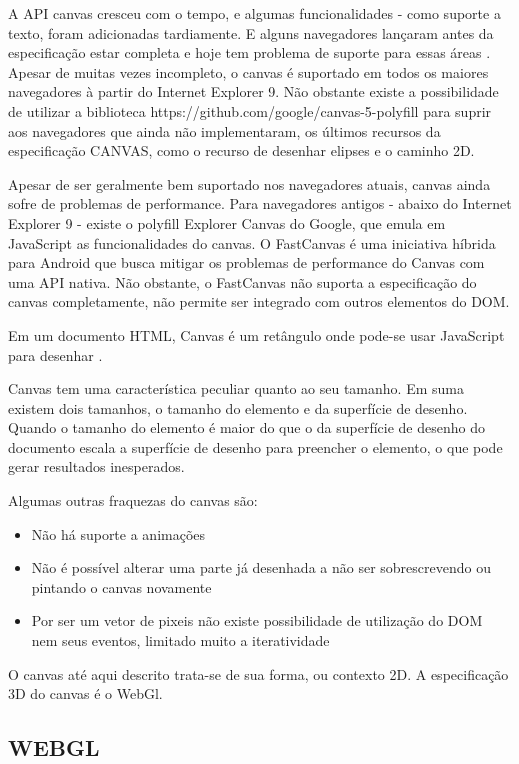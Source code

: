 A API canvas cresceu com o tempo, e algumas funcionalidades - como
suporte a texto, foram adicionadas tardiamente. E alguns navegadores
lançaram antes da especificação estar completa e hoje tem problema
de suporte para essas áreas \autocite{diveIntohtml}. Apesar de muitas
vezes incompleto, o canvas é suportado em todos os maiores navegadores
à partir do Internet Explorer 9. Não obstante existe a possibilidade de utilizar
a biblioteca https://github.com/google/canvas-5-polyfill para
suprir aos navegadores que ainda não implementaram, os últimos recursos
da especificação CANVAS, como o recurso de desenhar elipses e o caminho 2D.

Apesar de ser geralmente bem suportado nos navegadores atuais, canvas
ainda sofre de problemas de performance. Para navegadores antigos -
abaixo do Internet Explorer 9 - existe o polyfill Explorer Canvas
do Google, que emula em JavaScript as funcionalidades do canvas. O
FastCanvas é uma iniciativa híbrida para Android que busca mitigar os
problemas de performance do Canvas com uma API nativa. Não obstante, o
FastCanvas não suporta a especificação do canvas completamente, não
permite ser integrado com outros elementos do DOM.

Em um documento HTML, Canvas é um retângulo onde pode-se usar
JavaScript para desenhar \autocite[pp. 113]{diveIntohtml}.

Canvas tem uma característica peculiar quanto ao seu tamanho.
Em suma existem dois tamanhos, o tamanho do elemento e da superfície de
desenho. Quando o tamanho do elemento é maior do que o da superfície
de desenho do documento escala a superfície de desenho para preencher o
elemento, o que pode gerar resultados inesperados.

Algumas outras fraquezas do canvas são:
\begin{itemize}
\item{Não há suporte a animações}
\item{Não é possível alterar uma parte já desenhada a não ser sobrescrevendo ou pintando o canvas novamente}
\item{Por ser um vetor de pixeis não existe possibilidade de utilização do DOM nem seus eventos, limitado muito a iteratividade}
\end{itemize}

O canvas até aqui descrito trata-se de sua forma, ou contexto 2D. A
especificação 3D do canvas é o WebGl.

\subsection{WEBGL}

